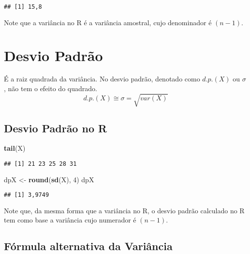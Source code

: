 \documentclass[
]{book}
\newenvironment{Shaded}{\begin{snugshade}}{\end{snugshade}}
\newcommand{\DecValTok}[1]{\textcolor[rgb]{0.00,0.00,0.81}{#1}}
\newcommand{\KeywordTok}[1]{\textcolor[rgb]{0.13,0.29,0.53}{\textbf{#1}}}
\newcommand{\NormalTok}[1]{#1}
\newcommand{\StringTok}[1]{\textcolor[rgb]{0.31,0.60,0.02}{#1}}
\begin{document}
\begin{verbatim}
## [1] 15,8
\end{verbatim}

Note que a variância no R é a variância amostral, cujo denominador é \((n-1)\).

\hypertarget{desvio-padruxe3o}{%
\section{Desvio Padrão}\label{desvio-padruxe3o}}

É a raiz quadrada da variância. No desvio padrão, denotado como \(d.p.(X)\) ou
\(\sigma\), não tem o efeito do quadrado.
\begin{equation*}
  d.p.(X) \cong \sigma = \sqrt{var(X)}
\end{equation*}

\hypertarget{desvio-padruxe3o-no-r}{%
\subsection{Desvio Padrão no R}\label{desvio-padruxe3o-no-r}}

\begin{Shaded}
\begin{Highlighting}[]
\KeywordTok{tail}\NormalTok{(X)}
\end{Highlighting}
\end{Shaded}

\begin{verbatim}
## [1] 21 23 25 28 31
\end{verbatim}

\begin{Shaded}
\begin{Highlighting}[]
\NormalTok{dpX <-}\StringTok{ }\KeywordTok{round}\NormalTok{(}\KeywordTok{sd}\NormalTok{(X), }\DecValTok{4}\NormalTok{)}
\NormalTok{dpX}
\end{Highlighting}
\end{Shaded}

\begin{verbatim}
## [1] 3,9749
\end{verbatim}

Note que, da mesma forma que a variância no R, o desvio padrão calculado no R tem como base a variância cujo numerador é \((n-1)\).

\hypertarget{fuxf3rmula-alternativa-da-variuxe2ncia}{%
\subsection{Fórmula alternativa da Variância}\label{fuxf3rmula-alternativa-da-variuxe2ncia}}
\end{document}
